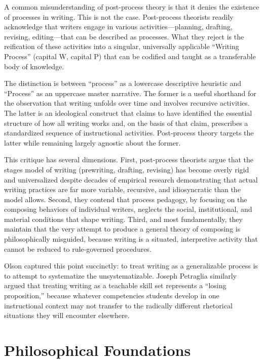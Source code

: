 \documentclass[12pt]{article}
\begin{document}
A common misunderstanding of post-process theory is that it denies the existence of processes in writing. This is not the case. Post-process theorists readily acknowledge that writers engage in various activities---planning, drafting, revising, editing---that can be described as processes. What they reject is the reification of these activities into a singular, universally applicable ``Writing Process'' (capital W, capital P) that can be codified and taught as a transferable body of knowledge.

The distinction is between ``process'' as a lowercase descriptive heuristic and ``Process'' as an uppercase master narrative. The former is a useful shorthand for the observation that writing unfolds over time and involves recursive activities. The latter is an ideological construct that claims to have identified the essential structure of how all writing works and, on the basis of that claim, prescribes a standardized sequence of instructional activities. Post-process theory targets the latter while remaining largely agnostic about the former.

This critique has several dimensions. First, post-process theorists argue that the stages model of writing (prewriting, drafting, revising) has become overly rigid and universalized despite decades of empirical research demonstrating that actual writing practices are far more variable, recursive, and idiosyncratic than the model allows. Second, they contend that process pedagogy, by focusing on the composing behaviors of individual writers, neglects the social, institutional, and material conditions that shape writing. Third, and most fundamentally, they maintain that the very attempt to produce a general theory of composing is philosophically misguided, because writing is a situated, interpretive activity that cannot be reduced to rule-governed procedures.

Olson captured this point succinctly: to treat writing as a generalizable process is to attempt to systematize the unsystematizable. Joseph Petraglia similarly argued that treating writing as a teachable skill set represents a ``losing proposition,'' because whatever competencies students develop in one instructional context may not transfer to the radically different rhetorical situations they will encounter elsewhere.

\section{Philosophical Foundations}
\end{document}
